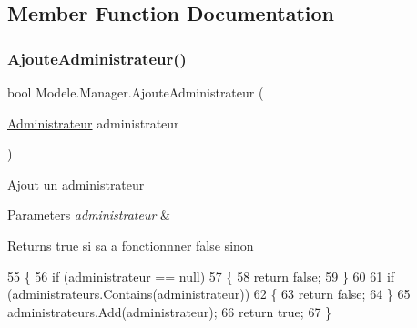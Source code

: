 \subsection{Member Function Documentation}
\mbox{\label{classModele_1_1Manager_a4e1ad1318c129128b7c375aa7c6a42e7}} 
\subsubsection{\texorpdfstring{Ajoute\+Administrateur()}{AjouteAdministrateur()}}
{\footnotesize\ttfamily bool Modele.\+Manager.\+Ajoute\+Administrateur (\begin{DoxyParamCaption}\item[{\hyperlink{classModele_1_1Administrateur}{Administrateur}}]{administrateur }\end{DoxyParamCaption})\hspace{0.3cm}{\ttfamily [inline]}}



Ajout un administrateur 


\begin{DoxyParams}{Parameters}
{\em administrateur} & \\
\hline
\end{DoxyParams}
\begin{DoxyReturn}{Returns}
true si sa a fonctionnner false sinon
\end{DoxyReturn}

\begin{DoxyCode}
55         \{
56             \textcolor{keywordflow}{if} (administrateur == null)
57             \{
58                 \textcolor{keywordflow}{return} \textcolor{keyword}{false};
59             \}
60 
61             \textcolor{keywordflow}{if} (administrateurs.Contains(administrateur))
62             \{
63                 \textcolor{keywordflow}{return} \textcolor{keyword}{false};
64             \}
65             administrateurs.Add(administrateur);
66             \textcolor{keywordflow}{return} \textcolor{keyword}{true};
67         \}
\end{DoxyCode}
\mbox{\label{classModele_1_1Manager_a713c89e0b2559c78652315a5c3e9da8c}} 
